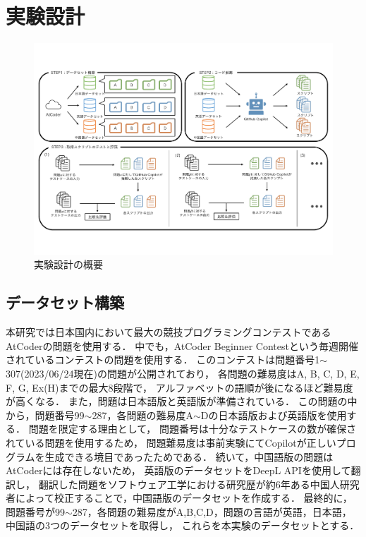 \section{実験設計\label{approach}}
  \begin{figure}[t]
    \centering
    \includegraphics[width=\linewidth]{image/system.pdf}
    \caption{実験設計の概要}
    \label{experiment_design}
  \end{figure}
  
  \subsection{データセット構築\label{build_dataset}}
    本研究では日本国内において最大の競技プログラミングコンテストであるAtCoder\cite{AtCoder}の問題を使用する．
    中でも，AtCoder Beginner Contestという毎週開催されているコンテストの問題を使用する．
    このコンテストは問題番号1${\sim}$307(2023/06/24現在)の問題が公開されており，
    各問題の難易度はA, B, C, D, E, F, G, Ex(H)までの最大8段階で，
    アルファベットの語順が後になるほど難易度が高くなる．
    また，問題は日本語版と英語版が準備されている．
    この問題の中から，問題番号99${\sim}$287，各問題の難易度A${\sim}$Dの日本語版および英語版を使用する．
    問題を限定する理由として，
    問題番号は十分なテストケースの数が確保されている問題を使用するため，
    問題難易度は事前実験にてCopilotが正しいプログラムを生成できる境目であったためである．
    続いて，中国語版の問題はAtCoderには存在しないため，
    英語版のデータセットをDeepL APIを使用して翻訳し，
    翻訳した問題をソフトウェア工学における研究歴が約6年ある中国人研究者によって校正することで，中国語版のデータセットを作成する．
    最終的に，問題番号が99${\sim}$287，各問題の難易度がA,B,C,D，問題の言語が英語，日本語，中国語の3つのデータセットを取得し，
    これらを本実験のデータセットとする．

